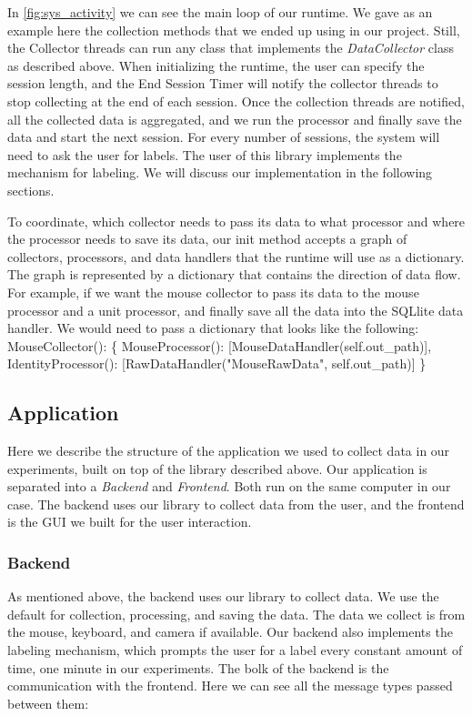 \documentclass[../main.tex]{subfiles}
\begin{document}
In \ref{fig:sys_activity} we can see the main loop of our runtime. We gave as an example here the collection methods that we ended up using in 
our project. Still, the Collector threads can run any class that implements the \textit{DataCollector} class as described above. 
When initializing the runtime, the user can specify the session length, and the End Session Timer will notify the collector threads to 
stop collecting at the end of each session. Once the collection threads are notified, all the collected data is aggregated, and we run the 
processor and finally save the data and start the next session. For every number of sessions, the system will need to ask the user for labels. 
The user of this library implements the mechanism for labeling. We will discuss our implementation in the following sections.


To coordinate, which collector needs to pass its data to what processor and where the processor needs to save its data, 
our init method accepts a graph of collectors, processors, and data handlers that the runtime will use as a dictionary. 
The graph is represented by a dictionary that contains the direction of data flow. For example, 
if we want the mouse collector to pass its data to the mouse processor and a unit processor, and finally save all the data into the SQLlite data handler. 
We would need to pass a dictionary that looks like the following:
MouseCollector(): \{ MouseProcessor(): [MouseDataHandler(self.out\_path)], IdentityProcessor(): [RawDataHandler("MouseRawData", self.out\_path)] \}

\newpage

\subsection{Application}

Here we describe the structure of the application we used to collect data in our experiments, built on top of the library described above. 
Our application is separated into a \textit{Backend} and \textit{Frontend}. Both run on the same computer in our case. 
The backend uses our library to collect data from the user, and the frontend is the GUI we built for the user interaction.

\subsubsection{Backend}
As mentioned above, the backend uses our library to collect data. We use the default for collection, processing, and saving the data. 
The data we collect is from the mouse, keyboard, and camera if available. Our backend also implements the labeling mechanism, 
which prompts the user for a label every constant amount of time, one minute in our experiments.
The bolk of the backend is the communication with the frontend. Here we can see all the message types passed between them:
\end{document}
